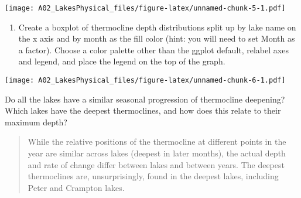 \documentclass[
]{article}
\newenvironment{Shaded}{\begin{snugshade}}{\end{snugshade}}
\newcommand{\AttributeTok}[1]{\textcolor[rgb]{0.77,0.63,0.00}{#1}}
\newcommand{\CommentTok}[1]{\textcolor[rgb]{0.56,0.35,0.01}{\textit{#1}}}
\newcommand{\FunctionTok}[1]{\textcolor[rgb]{0.00,0.00,0.00}{#1}}
\newcommand{\NormalTok}[1]{#1}
\newcommand{\OtherTok}[1]{\textcolor[rgb]{0.56,0.35,0.01}{#1}}
\newcommand{\SpecialCharTok}[1]{\textcolor[rgb]{0.00,0.00,0.00}{#1}}
\newcommand{\StringTok}[1]{\textcolor[rgb]{0.31,0.60,0.02}{#1}}
\providecommand{\tightlist}{%
  \setlength{\itemsep}{0pt}\setlength{\parskip}{0pt}}
\begin{document}
\texttt{[image: A02\_LakesPhysical\_files/figure-latex/unnamed-chunk-5-1.pdf]}

\begin{enumerate}
\def\labelenumi{\arabic{enumi}.}
\setcounter{enumi}{7}
\tightlist
\item
  Create a boxplot of thermocline depth distributions split up by lake
  name on the x axis and by month as the fill color (hint: you will need
  to set Month as a factor). Choose a color palette other than the
  ggplot default, relabel axes and legend, and place the legend on the
  top of the graph.
\end{enumerate}

\begin{Shaded}
\end{Shaded}

\texttt{[image: A02\_LakesPhysical\_files/figure-latex/unnamed-chunk-6-1.pdf]}

Do all the lakes have a similar seasonal progression of thermocline
deepening? Which lakes have the deepest thermoclines, and how does this
relate to their maximum depth?

\begin{quote}
While the relative positions of the thermocline at different points in
the year are similar across lakes (deepest in later months), the actual
depth and rate of change differ between lakes and between years. The
deepest thermoclines are, unsurprisingly, found in the deepest lakes,
including Peter and Crampton lakes.
\end{quote}
\end{document}

